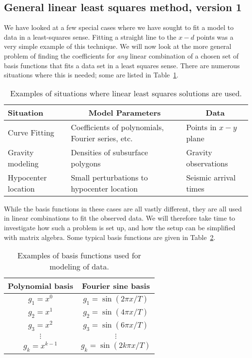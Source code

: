 \subsection{General linear least squares method, version 1}

	We have looked at a few special cases where we have sought to fit a model to data in a 
least-squares sense.  Fitting a straight line to the $x-d$ points was a very simple example of this 
technique. We will now look at the more general problem of finding the coefficients for \emph{any} 
linear combination of a chosen set of basis functions that fits a data set in a least squares sense. There are 
numerous situations where this is needed; some are listed in Table~\ref{tbl:LLS_examples}.

\begin{table}[h]
\centering
\begin{tabular}{|l|p{1.5in}|l|}
\hline
\bf{Situation}  & \multicolumn{1}{c|}{\bf{Model Parameters}} & \multicolumn{1}{c|}{\bf{Data}} \\ \hline
Curve Fitting & 
Coefficients of polynomials, Fourier series, etc. &
Points in $x-y$ plane \\ \hline
Gravity modeling &
Densities of subsurface polygons & 
Gravity observations\\ \hline
Hypocenter location & 
Small perturbations to hypocenter location & Seismic arrival times \\ \hline
\end{tabular}
\caption{Examples of situations where linear least squares solutions are used.}
\label{tbl:LLS_examples}
\end{table}

While the basis functions in these cases are all vastly different, they are all used in linear 
combinations to fit the observed data. We will therefore take time to investigate how such a 
problem is set up, and how the setup can be simplified with matrix algebra.
Some typical basis functions are given in Table~\ref{tbl:basis_funcs}.

\begin{table}[h]
\centering
\begin{tabular}{|c|c|}
\hline
\bf{Polynomial basis} & \bf{Fourier sine basis}\\ \hline
$g_1=x^0$  & $g_1=\sin(2\pi x/T)$\\ \hline
$g_2=x^1$  & $g_2=\sin(4\pi x/T)$\\ \hline
$g_3=x^2$  & $g_3=\sin(6\pi x/T)$\\ \hline
$\vdots$ & $\vdots$\\ \hline
$g_k=x^{k-1}$  & $g_k=\sin(2k\pi x/T)$ \\ \hline
\end{tabular}
\caption{Examples of basis functions used for modeling of data.}
\label{tbl:basis_funcs}
\end{table}

